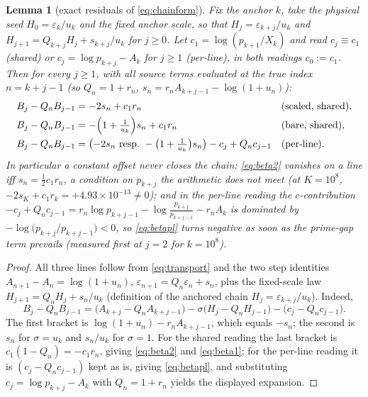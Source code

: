 \documentclass[11pt]{article}
\newtheorem{lemma}[theorem]{Lemma}
\theoremstyle{remark}
\newcommand{\Xk}{X_k}
\newcommand{\Ak}{A_k}
\newcommand{\uk}{u_k}
\newcommand{\rk}{r_k}
\newcommand{\eps}{\varepsilon}
\begin{document}
\begin{lemma}[exact residuals of \eqref{eq:chainform}]\label{lem:betas}
Fix the anchor $k$, take the physical seed $H_0=\eps_k/\uk$ and the fixed
anchor scale, so that $H_j=\eps_{k+j}/\uk$ and
$H_{j+1}=Q_{k+j}H_j+s_{k+j}/\uk$ for $j\ge0$. Let
$c_1=\log(p_{k+1}/\Xk)$ and read $c_j\equiv c_1$ (shared) or
$c_j=\log p_{k+j}-\Ak$ for $j\ge1$ (per-line), in both readings
$c_0:=c_1$. Then for every $j\ge1$, with all source terms evaluated at the
true index $n=k+j-1$ (so $Q_n=1+r_n$, $s_n=r_nA_{k+j-1}-\log(1+u_n)$):
\begin{align}
B_j-Q_nB_{j-1}&=-2s_n+c_1r_n
&&\text{(scaled, shared)},\label{eq:beta2}\\
B_j-Q_nB_{j-1}&=-\Bigl(1+\tfrac1{\uk}\Bigr)s_n+c_1r_n
&&\text{(bare, shared)},\label{eq:beta1}\\
B_j-Q_nB_{j-1}&=\bigl(-2s_n\ \text{resp.}\ -\bigl(1+\tfrac1{\uk}\bigr)s_n\bigr)
-c_j+Q_nc_{j-1}&&\text{(per-line)}\label{eq:betapl}.
\end{align}
In particular a \emph{constant} offset never closes the chain:
\eqref{eq:beta2} vanishes on a line iff $s_n=\tfrac12c_1r_n$, a condition
on $p_{k+j}$ the arithmetic does not meet (at $K=10^8$,
$-2s_K+c_1\rk=+4.93\times10^{-13}\neq0$); and in the per-line reading the
$c$-contribution
$-c_j+Q_nc_{j-1}=r_n\log p_{k+j-1}-\log\frac{p_{k+j}}{p_{k+j-1}}-r_n\Ak$
is dominated by $-\log\bigl(p_{k+j}/p_{k+j-1}\bigr)<0$, so \eqref{eq:betapl}
turns negative as soon as the prime-gap term prevails (measured first at
$j=2$ for $k=10^8$).
\end{lemma}

\begin{proof}
All three lines follow from \eqref{eq:transport} and the two step
identities $A_{n+1}-A_n=\log(1+u_n)$, $\eps_{n+1}=Q_n\eps_n+s_n$, plus
the fixed-scale law $H_{j+1}=Q_nH_j+s_n/\uk$ (definition of the anchored
chain $H_j=\eps_{k+j}/\uk$). Indeed,
\[
B_j-Q_nB_{j-1}
=\bigl(A_{k+j}-Q_nA_{k+j-1}\bigr)-\sigma\bigl(H_j-Q_nH_{j-1}\bigr)-\bigl(c_j-Q_nc_{j-1}\bigr).
\]
The first bracket is $\log(1+u_n)-r_nA_{k+j-1}$, which equals $-s_n$;
the second is $s_n$ for $\sigma=\uk$ and $s_n/\uk$ for $\sigma=1$. For the
shared reading the last bracket is $c_1(1-Q_n)=-c_1r_n$, giving
\eqref{eq:beta2} and \eqref{eq:beta1}; for the per-line reading it is
$(c_j-Q_nc_{j-1})$ kept as is, giving \eqref{eq:betapl}, and substituting
$c_j=\log p_{k+j}-\Ak$ with $Q_n=1+r_n$ yields the displayed expansion.
\end{proof}
\end{document}
